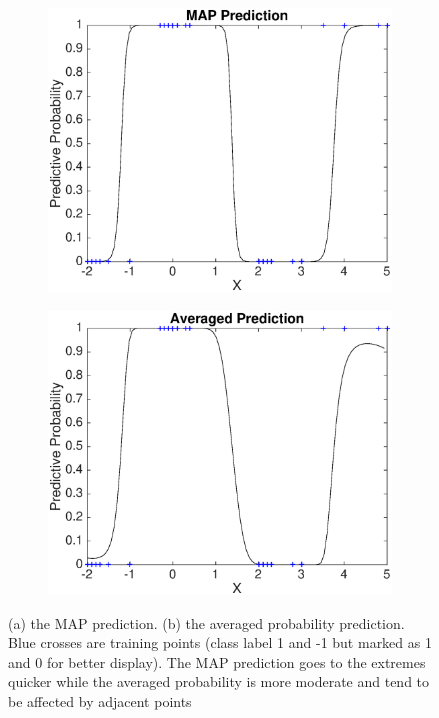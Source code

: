 \documentclass[14pt]{report}
\numberwithin{equation}{chapter}
\begin{document}
\begin{spacing}{2}
\begin{figure}
\begin{subfigure}{0.48\textwidth}
\centering
	\includegraphics[scale = 0.4]{classification_MAP.eps}
	\caption{}
\end{subfigure}
\hspace*{0.05\textwidth}
\begin{subfigure}{0.48\textwidth}
\centering
	\includegraphics[scale = 0.4]{classification_ave.eps}
	\caption{}
\end{subfigure}

\caption{(a) the MAP prediction. (b) the averaged probability prediction. Blue crosses are training points (class label 1 and -1 but marked as 1 and 0 for better display). The MAP prediction goes to the extremes quicker while the averaged probability is more moderate and tend to be affected by adjacent points}



\end{figure}
\end{spacing}
\end{document}
